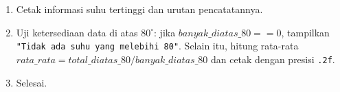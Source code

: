 \documentclass[12pt,a4paper]{article}
\begin{document}
\begin{enumerate}
\begin{enumerate}[label=\alph*.]
\begin{enumerate}[label=\roman*.]
            \item Evaluasi sub-masalah 2 dan 3: jika $suhu > 80$: perbarui $banyak\_diatas\_80 = banyak\_diatas\_80 + 1$ dan $total\_diatas\_80 = total\_diatas\_80 + suhu$.
        \end{enumerate}
        \item Cetak informasi suhu tertinggi dan urutan pencatatannya.
        \item Uji ketersediaan data di atas $80^\circ$: jika $banyak\_diatas\_80 == 0$, tampilkan \texttt{"Tidak ada suhu yang melebihi 80"}. Selain itu, hitung rata-rata $rata\_rata = total\_diatas\_80 / banyak\_diatas\_80$ dan cetak dengan presisi \texttt{.2f}.
        \item Selesai.
    \end{enumerate}
\end{enumerate}
\end{document}
